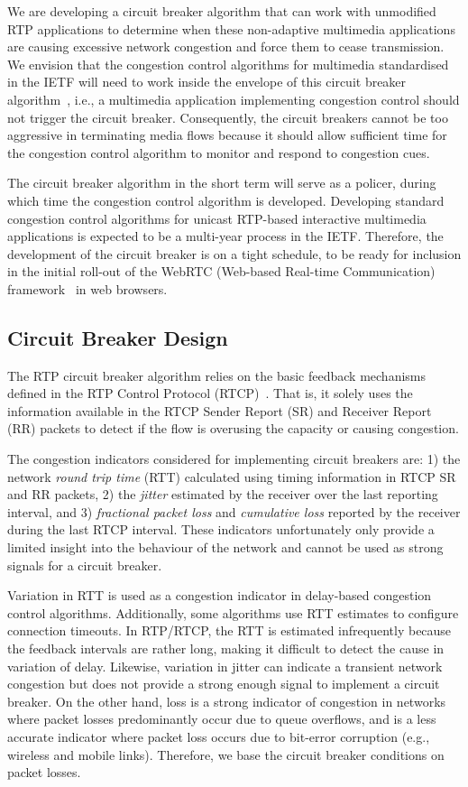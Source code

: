 We are developing a circuit breaker algorithm that can work with unmodified
RTP applications to determine when these non-adaptive multimedia
applications are causing excessive network congestion and force them to cease
transmission. We envision that the congestion control algorithms for
multimedia standardised in the IETF will need to work inside the envelope of
this circuit breaker algorithm~\cite{draft.rmcat.evaluate}, i.e., a multimedia
application implementing congestion control should not trigger the circuit
breaker. Consequently, the circuit breakers cannot be too aggressive in
terminating media flows because it should allow sufficient time for the
congestion control algorithm to monitor and respond to congestion cues.

The circuit breaker algorithm in the short term will serve as a policer,
during which time the congestion control algorithm is developed. Developing
standard congestion control algorithms for unicast RTP-based interactive
multimedia applications is expected to be a multi-year process in the IETF.
Therefore, the development of the circuit breaker is on a tight schedule, to
be ready for inclusion in the initial roll-out of the WebRTC (Web-based
Real-time Communication) framework~\cite{jennings:2013:webrtc} in web browsers.

\subsection{Circuit Breaker Design}
\label{fw.cb.design}

The RTP circuit breaker algorithm relies on the basic feedback mechanisms
defined in the RTP Control Protocol (RTCP)~\cite{rfc3550}. That is, it solely
uses the information available in the RTCP Sender Report (SR) and Receiver
Report (RR) packets to detect if the flow is overusing the capacity or causing
congestion.

The congestion indicators considered for implementing circuit breakers are: 1)
the network \emph{round trip time} (RTT) calculated using timing information
in RTCP SR and RR packets, 2) the \emph{jitter} estimated by the receiver over the
last reporting interval, and 3) \emph{fractional packet loss} and \emph{cumulative
loss} reported by the receiver during the last RTCP interval. These
indicators unfortunately only provide a limited insight into the behaviour of
the network and cannot be used as strong signals for a circuit breaker.

Variation in RTT is used as a congestion indicator in delay-based congestion
control algorithms. Additionally, some algorithms use RTT estimates to
configure connection timeouts. In RTP/RTCP, the RTT is estimated infrequently
because the feedback intervals are rather long, making it difficult to detect
the cause in variation of delay. Likewise, variation in jitter can indicate a
transient network congestion but does not provide a strong enough signal to implement
a circuit breaker. On the other hand, loss is a strong indicator of congestion
in networks where packet losses predominantly occur due to queue overflows, and
is a less accurate indicator where packet loss occurs due to bit-error
corruption (e.g., wireless and mobile links). Therefore, we base the circuit
breaker conditions on packet losses.

